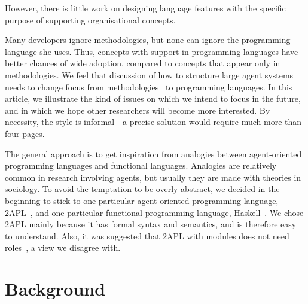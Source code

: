 \documentclass[conference,compsoc]{IEEEtran} %
\newcommand{\todo}[1]{{\small \textcolor{gray}{[\textcolor{red}{TODO}: #1]}}}
\begin{document}
However, there is little work on designing language features with the
specific purpose of supporting organisational concepts.


Many developers ignore methodologies, but none can ignore the programming
language she uses. Thus, concepts with support in programming languages
have better chances of wide adoption, compared to concepts that appear only
in methodologies. We feel that discussion of how to structure large agent
systems needs to change focus from
methodologies~\cite{dblp:conf/aose/ferbergm03} to programming languages.
In this article, we illustrate the kind of issues on which we intend to
focus in the future, and in which we hope other researchers will become
more interested. By necessity, the style is informal---a precise solution
would require much more than four pages.

The general approach is to get inspiration from analogies between
agent-oriented programming languages and functional languages. Analogies
are relatively common in research involving agents, but usually they are
made with theories in sociology. To avoid the temptation to be overly
abstract, we decided in the beginning to stick to one particular
agent-oriented programming language,
2APL~\cite{DBLP:journals/aamas/Dastani08}, and one particular functional
programming language, Haskell~\cite{web:haskell}. We chose 2APL mainly
because it has formal syntax and semantics, and is therefore easy to
understand. Also, it was suggested that 2APL with modules does not need
roles~\cite{dblp:conf/prima/dastanims08}, a view we disagree with.

\section{Background} %
\end{document}
